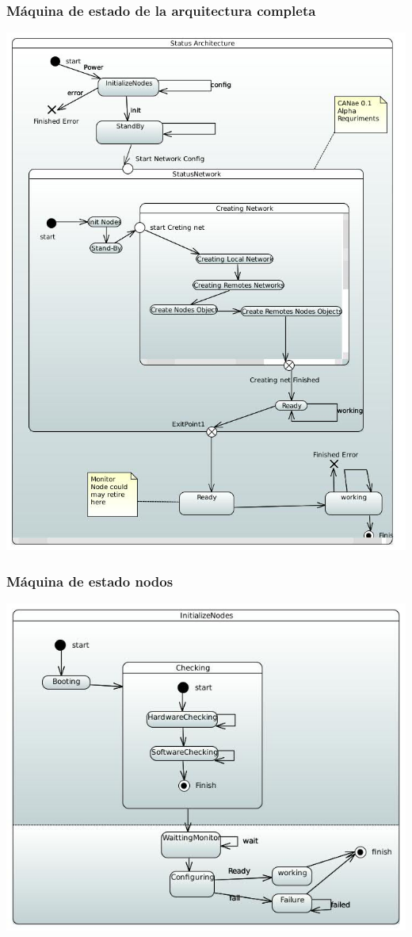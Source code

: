 \begin{frame}[c]
	\frametitle{Máquina de estado de la arquitectura completa}
	\centering
	\includegraphics[scale=0.4]{images/StateMachineArqCompleta.JPG}
\end{frame}

\begin{frame}[c]
	\frametitle{Máquina de estado nodos}
	\centering
	\includegraphics[scale=0.4]{images/InitializeNodes.JPG}
\end{frame}

